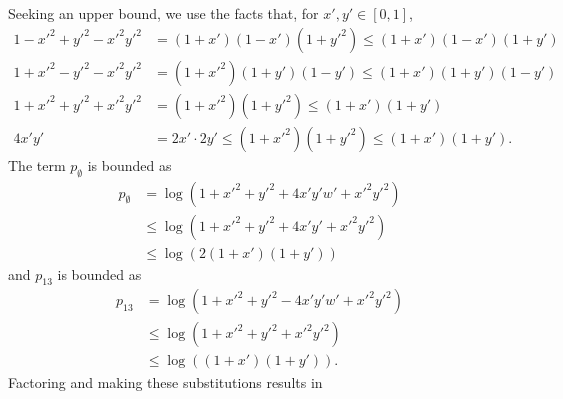 Seeking an upper bound, we use the facts that, for $x',y'\in[0,1]$,
\begin{align*}
1-x'^2+y'^2-x'^2y'^2 & = (1+x')(1-x')(1+y'^2) \le (1+x')(1-x')(1+y') \\
1+x'^2-y'^2-x'^2y'^2 & = (1+x'^2)(1+y')(1-y') \le (1+x')(1+y')(1-y') \\
1+x'^2+y'^2+x'^2y'^2 & = (1+x'^2)(1+y'^2) \le (1+x')(1+y') \\
4x'y' & = 2x' \cdot 2y' \le (1+x'^2)(1+y'^2) \le (1+x')(1+y').
\end{align*}
The term $p_{\emptyset}$ is bounded as
\begin{align*}
    p_{\emptyset} & = \log(1+x'^2+y'^2+4x'y'w'+x'^2y'^2) \\
                  & \le \log(1+x'^2+y'^2+4x'y'+x'^2y'^2) \\
                  & \le \log(2(1+x')(1+y'))
\end{align*}
and $p_{13}$ is bounded as
\begin{align*}
    p_{13} & = \log(1+x'^2+y'^2-4x'y'w'+x'^2y'^2) \\
                  & \le \log(1+x'^2+y'^2+x'^2y'^2) \\
                  & \le \log((1+x')(1+y')).
\end{align*}
Factoring and making these substitutions results in
